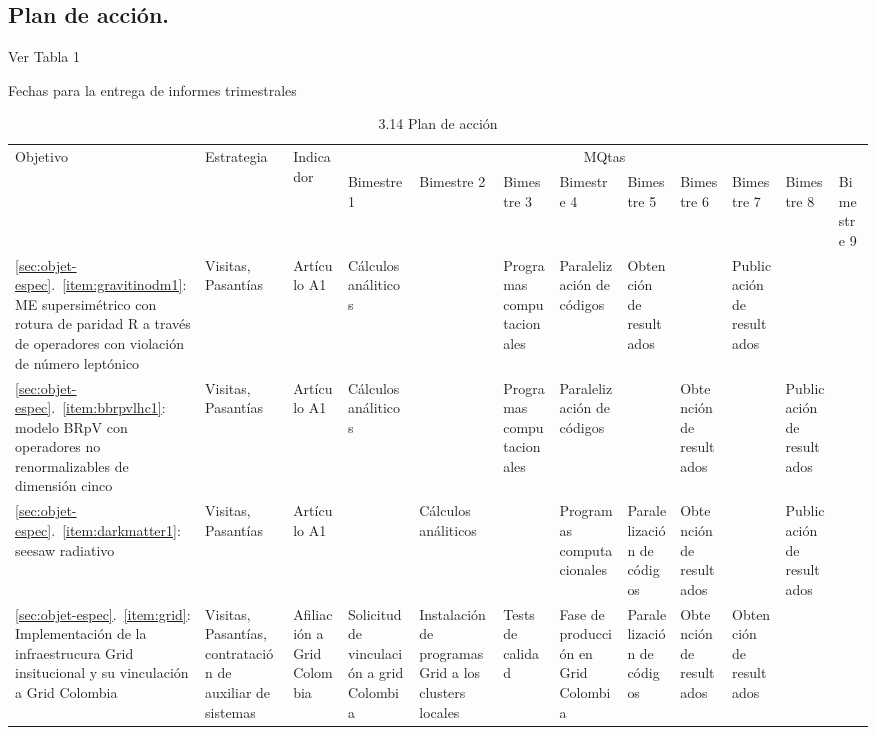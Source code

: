 \subsection{Plan de acción.}
Ver Tabla 1
\begin{evaluacion}
  Fechas para la entrega de informes trimestrales
\end{evaluacion}
\begin{sidewaystable}[htdp]
\footnotesize
\caption{3.14 Plan de acción}  %
\centering
\begin{tabular}{|p{2cm}|p{1.7cm}|p{1.5cm}|p{1.5cm}|p{1.5cm}|p{1.5cm}|p{1.5cm}|p{1.5cm}|p{1.5cm}|p{1.5cm}|p{1.5cm}|p{1.5cm}|}\hline
  \multirow{2}{*}{Objetivo} & \multirow{2}{*}{Estrategia} & \multirow{2}{*}{Indicador}  & \multicolumn{9}{|c|}{MQtas}\\
\cline{4-12} 
& & & Bimestre 1 &Bimestre 2 & Bimestre 3& Bimestre 4& Bimestre 5& Bimestre 6& Bimestre 7& Bimestre 8& Bimestre 9\\\hline 
\ref{sec:objet-espec}.~\ref{item:gravitinodm1}: ME supersimétrico con
  rotura de paridad R a través de operadores con violación de número
  leptónico&Visitas, Pasantías&Artículo A1&Cálculos análiticos&&Programas computacionales&Pa\-ra\-le\-li\-za\-ción de códigos&Obtención de resultados&&Publicación de resultados&&\\\hline
\ref{sec:objet-espec}.~\ref{item:bbrpvlhc1}: modelo BRpV con operadores no renormalizables de dimensión cinco&Visitas, Pasantías&Artículo A1&Cálculos análiticos&&Programas computacionales&Pa\-ra\-le\-li\-za\-ción de códigos&&Obtención de resultados&&Publicación de resultados&\\\hline
\ref{sec:objet-espec}.~\ref{item:darkmatter1}: seesaw radiativo&Visitas, Pasantías&Artículo A1&&Cálculos análiticos&&Programas computacionales&Pa\-ra\-le\-li\-za\-ción de códigos&Obtención de resultados&&Publicación de resultados&\\\hline
\ref{sec:objet-espec}.~\ref{item:grid}: Implementación de la infraestrucura Grid insitucional y su vinculación a Grid Colombia&Visitas, Pasantías, contratación de auxiliar de sistemas&Afiliación a Grid Colombia&Solicitud de vinculación a grid Colombia&Instalación de programas Grid a los clusters locales&Tests de calidad&Fase de producción en Grid Colombia&Pa\-ra\-le\-li\-za\-ción de códigos&Obtención de resultados&Obtención de resultados&&\\\hline
\end{tabular}
\label{tab:LPer}
\end{sidewaystable}

